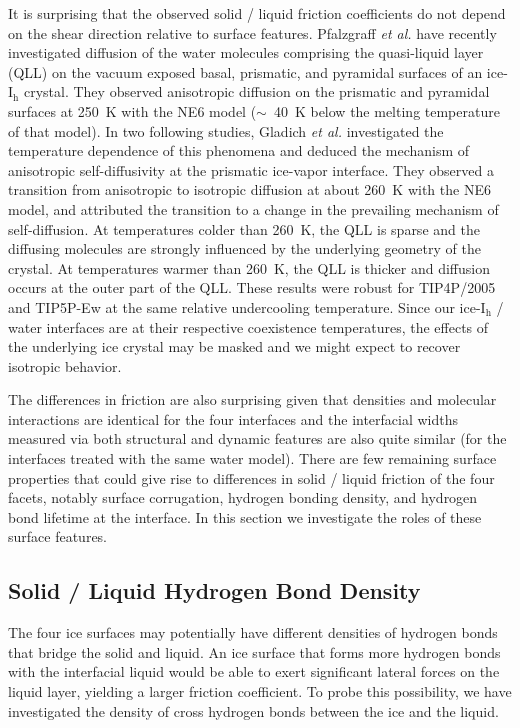 It is surprising that the observed solid / liquid friction
coefficients do not depend on the shear direction relative to surface
features. Pfalzgraff \textit{et al.} have recently investigated
diffusion of the water molecules comprising the quasi-liquid layer
(QLL) on the vacuum exposed basal, prismatic, and pyramidal surfaces
of an ice-I$_\mathrm{h}$ crystal.\cite{Pfalzgraff2011} They observed
anisotropic diffusion on the prismatic and pyramidal surfaces at 250~K
with the NE6 model ($\sim$~40~K below the melting temperature of that
model). In two following studies, Gladich \textit{et al.}
investigated the temperature dependence of this phenomena and deduced
the mechanism of anisotropic self-diffusivity at the prismatic
ice-vapor interface.\cite{Gladich2011,Gladich2015} They observed a
transition from anisotropic to isotropic diffusion at about 260~K with
the NE6 model, and attributed the transition to a change in the
prevailing mechanism of self-diffusion. At temperatures colder than
260~K, the QLL is sparse and the diffusing molecules are strongly
influenced by the underlying geometry of the crystal. At temperatures
warmer than 260~K, the QLL is thicker and diffusion occurs at the
outer part of the QLL. These results were robust for TIP4P/2005 and
TIP5P-Ew at the same relative undercooling temperature. Since our
ice-I$_\mathrm{h}$ / water interfaces are at their respective
coexistence temperatures, the effects of the underlying ice crystal
may be masked and we might expect to recover isotropic behavior.

The differences in friction are also surprising given that densities
and molecular interactions are identical for the four interfaces and
the interfacial widths measured via both structural and dynamic
features are also quite similar (for the interfaces treated with the
same water model). There are few remaining surface properties that
could give rise to differences in solid / liquid friction of the four
facets, notably surface corrugation, hydrogen bonding density, and
hydrogen bond lifetime at the interface. In this section we
investigate the roles of these surface features.

\subsection{Solid / Liquid Hydrogen Bond Density}
The four ice surfaces may potentially have different densities of
hydrogen bonds that bridge the solid and liquid. An ice surface that
forms more hydrogen bonds with the interfacial liquid would be able to
exert significant lateral forces on the liquid layer, yielding a
larger friction coefficient. To probe this possibility, we have
investigated the density of cross hydrogen bonds between the ice and
the liquid.

